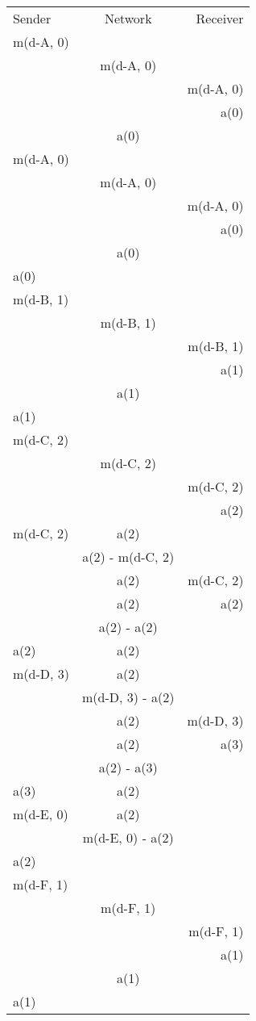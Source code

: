 \documentclass{jhwhw}
\begin{document}
\begin{tabular}{l c r}
Sender & Network & Receiver \\
m(d-A, 0) & & \\
& m(d-A, 0) & \\
& & m(d-A, 0) \\
& & a(0) \\
& a(0) & \\
m(d-A, 0) & & \\
& m(d-A, 0) & \\
& & m(d-A, 0) \\
& & a(0) \\
& a(0) & \\
a(0) & & \\
m(d-B, 1) & & \\
& m(d-B, 1) & \\
& & m(d-B, 1) \\
& & a(1) \\
& a(1) & \\
a(1) & & \\
m(d-C, 2) & & \\
& m(d-C, 2) & \\
& & m(d-C, 2) \\
& & a(2) \\
m(d-C, 2) & a(2) & \\
& a(2) - m(d-C, 2) & \\
& a(2) & m(d-C, 2) \\
& a(2) & a(2) \\
& a(2) - a(2) & \\
a(2) & a(2) & \\
m(d-D, 3) & a(2) & \\
& m(d-D, 3) - a(2) & \\
& a(2) & m(d-D, 3) \\
& a(2) & a(3) \\
& a(2) - a(3) & \\
a(3) & a(2) & \\
m(d-E, 0) & a(2) & \\
& m(d-E, 0) - a(2) & \\
a(2) & & \\
m(d-F, 1) & & \\
& m(d-F, 1) & \\
& & m(d-F, 1) \\
& & a(1) \\
& a(1) & \\
a(1) & & \\

\end{tabular}
\end{document}
